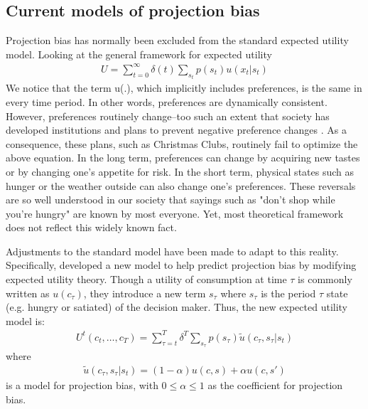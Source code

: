 \documentclass[12pt]{article}
\begin{document}
	\subsection{Current models of projection bias}
	Projection bias has normally been excluded from the standard expected utility model. Looking at the general framework for expected utility
	\begin{align} 
	U = \sum_{t=0}^{\infty}\delta(t)\sum_{s_t}^{}p(s_t)u(x_t|s_t)
	\end{align}
	 We notice that the term u(.), which implicitly includes preferences, is the same in every time period. In other words, preferences are dynamically consistent. However, preferences routinely change--too such an extent that society has developed institutions and plans to prevent negative preference changes \citep{shefrin_thaler_1977}. As a consequence, these plans, such as Christmas Clubs, routinely fail to optimize the above equation. In the long term, preferences can change by acquiring new tastes or by changing one's appetite for risk. In the short term, physical states such as hunger or the weather outside can also change one's preferences. These reversals are so well understood in our society that sayings such as "don't shop while you're hungry" are known by most everyone. Yet, most theoretical framework does not reflect this widely known fact. 
	 
	 Adjustments to the standard model have been made to adapt to this reality. Specifically,  \cite{loewenstein_odonoghue_rabin_2003} developed a new model to help predict projection bias by modifying expected utility theory. Though a utility of consumption at time $\tau$ is commonly written as $u(c_\tau)$, they introduce a new term $s_\tau$ where $s_\tau$ is the period $\tau$ state (e.g. hungry or satiated) of the decision maker. Thus, the new expected utility model is:
	 \begin{align}
	 U^t (c_t, \dots, c_T) = \sum_{\tau = t}^{T}\delta^T \sum_{s_\tau}^{}p(s_\tau)\tilde{u}(c_\tau, s_\tau|s_t)
	 \end{align}
	where 
	\begin{align} 
	\tilde{u}(c_\tau, s_\tau|s_t) = (1-\alpha)u(c,s)+\alpha u(c,s')
	\end{align}
	is a model for projection bias, with $ 0\leq \alpha \leq 1$ as the coefficient for projection bias.
	
\end{document}
